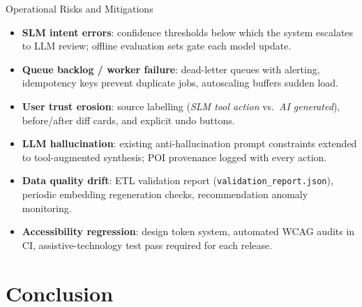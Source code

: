 \documentclass[aspectratio=169,professionalfonts]{beamer}
\newcommand{\hl}[1]{\textbf{\textcolor{ysblue}{#1}}}
\begin{document}
\begin{frame}{Operational Risks and Mitigations}
  \begin{itemize}
    \item<1-> \hl{SLM intent errors}: confidence thresholds below which the system
          escalates to LLM review; offline evaluation sets gate each model update.
    \item<2-> \hl{Queue backlog / worker failure}: dead-letter queues with alerting,
          idempotency keys prevent duplicate jobs, autoscaling buffers sudden load.
    \item<3-> \hl{User trust erosion}: source labelling (\emph{SLM tool action} vs.\
          \emph{AI generated}), before/after diff cards, and explicit undo buttons.
    \item<4-> \hl{LLM hallucination}: existing anti-hallucination prompt constraints
          extended to tool-augmented synthesis; POI provenance logged with every action.
    \item<5-> \hl{Data quality drift}: ETL validation report (\texttt{validation\_report.json}),
          periodic embedding regeneration checks, recommendation anomaly monitoring.
    \item<6-> \hl{Accessibility regression}: design token system, automated WCAG audits
          in CI, assistive-technology test pass required for each release.
  \end{itemize}
\end{frame}

\section{Conclusion}
\end{document}

